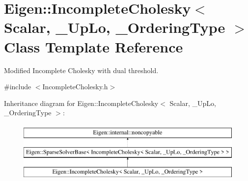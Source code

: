 \hypertarget{class_eigen_1_1_incomplete_cholesky}{}\section{Eigen\+::Incomplete\+Cholesky$<$ Scalar, \+\_\+\+Up\+Lo, \+\_\+\+Ordering\+Type $>$ Class Template Reference}
\label{class_eigen_1_1_incomplete_cholesky}


Modified Incomplete Cholesky with dual threshold.  




{\ttfamily \#include $<$Incomplete\+Cholesky.\+h$>$}

Inheritance diagram for Eigen\+::Incomplete\+Cholesky$<$ Scalar, \+\_\+\+Up\+Lo, \+\_\+\+Ordering\+Type $>$\+:\begin{figure}[H]
\begin{center}
\leavevmode
\includegraphics[height=3.000000cm]{class_eigen_1_1_incomplete_cholesky}
\end{center}
\end{figure}
